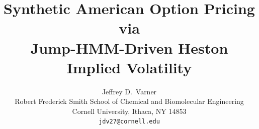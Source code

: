 \documentclass{article}
\title{Synthetic American Option Pricing via\\Jump-HMM-Driven Heston Implied Volatility}
\author{
  Jeffrey D.\ Varner \\
  Robert Frederick Smith School of Chemical and Biomolecular Engineering\\
  Cornell University, Ithaca, NY 14853 \\
  \texttt{jdv27@cornell.edu}
}
\begin{document}
\maketitle

\begin{abstract}

\end{abstract}












\appendix

\end{document}
